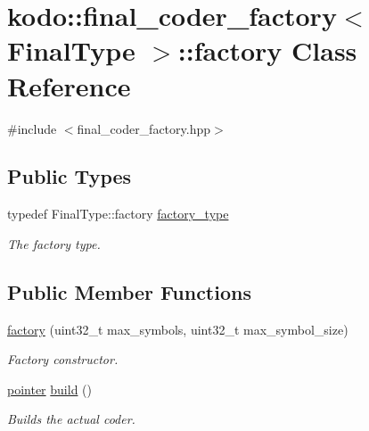 \hypertarget{classkodo_1_1final__coder__factory_1_1factory}{\section{kodo\-:\-:final\-\_\-coder\-\_\-factory$<$ Final\-Type $>$\-:\-:factory Class Reference}
\label{classkodo_1_1final__coder__factory_1_1factory}
}


{\ttfamily \#include $<$final\-\_\-coder\-\_\-factory.\-hpp$>$}

\subsection*{Public Types}
\begin{DoxyCompactItemize}
\item 
\hypertarget{classkodo_1_1final__coder__factory_1_1factory_aa7d6bd85df162d56901f6eaa600943ac}{typedef Final\-Type\-::factory \hyperlink{classkodo_1_1final__coder__factory_1_1factory_aa7d6bd85df162d56901f6eaa600943ac}{factory\-\_\-type}}\label{classkodo_1_1final__coder__factory_1_1factory_aa7d6bd85df162d56901f6eaa600943ac}

\begin{DoxyCompactList}\small\item\em The factory type. \end{DoxyCompactList}\end{DoxyCompactItemize}
\subsection*{Public Member Functions}
\begin{DoxyCompactItemize}
\item 
\hyperlink{classkodo_1_1final__coder__factory_1_1factory_a91092e4616f93b5fb6f2f0559ea38020}{factory} (uint32\-\_\-t max\-\_\-symbols, uint32\-\_\-t max\-\_\-symbol\-\_\-size)
\begin{DoxyCompactList}\small\item\em Factory constructor. \end{DoxyCompactList}\item 
\hyperlink{classkodo_1_1final__coder__factory_a24608d97861db353b6e425c01d9154bb}{pointer} \hyperlink{classkodo_1_1final__coder__factory_1_1factory_a8df922a8578b78ad40d102a2e0e5659d}{build} ()
\begin{DoxyCompactList}\small\item\em Builds the actual coder. \end{DoxyCompactList}\end{DoxyCompactItemize}


